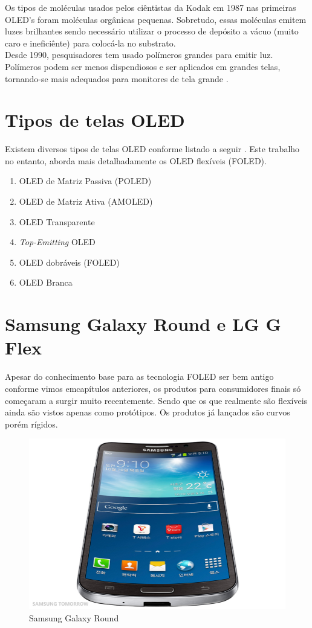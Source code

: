 Os tipos de moléculas usados pelos ciêntistas da Kodak em 1987 nas primeiras OLED's foram moléculas orgânicas pequenas. Sobretudo, essas moléculas emitem luzes brilhantes sendo necessário utilizar o processo de depósito a vácuo (muito caro e ineficiênte) para colocá-la no substrato. \\

Desde 1990, pesquisadores tem usado polímeros grandes para emitir luz. Polímeros podem ser menos dispendiosos e ser aplicados em grandes telas, tornando-se mais adequados para monitores de tela grande \cite{HSWOLED}.\\


\section{Tipos de telas OLED}
\label{sec:tipos}

Existem diversos tipos de telas OLED conforme listado a seguir \cite{HSWOLED}. Este trabalho no entanto, aborda mais detalhadamente os OLED flexíveis (FOLED).

\begin{enumerate}
	\item OLED de Matriz Passiva (POLED)
	\item OLED de Matriz Ativa (AMOLED)
	\item OLED Transparente 
	\item \textit{Top-Emitting} OLED 
	\item OLED dobráveis (FOLED)
	\item OLED Branca 
\end{enumerate}


\section{Samsung Galaxy Round e LG G Flex}
\label{sec:devicesnomercado}

Apesar do conhecimento base para as tecnologia FOLED ser bem antigo conforme vimos emcapítulos anteriores, os produtos para consumidores finais só começaram a surgir muito recentemente. Sendo que os que realmente são flexíveis ainda são vistos apenas como protótipos. Os produtos já lançados são curvos porém rígidos.

\begin{figure}[!ht]
  \centering
  \includegraphics[width=.60\textwidth]{./figuras/galaxy-round} 
  \caption{Samsung Galaxy Round}
  \label{fig:galaxy-round} 
\end{figure}

